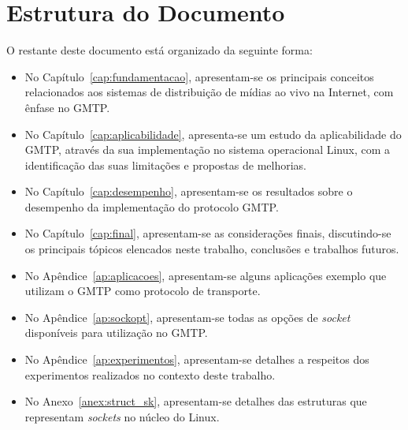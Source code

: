 % 
% 
% 
% 
\section{Estrutura do Documento}
\label{sec:estrutura}

O restante deste documento está organizado da seguinte forma:

\begin{itemize}
  \item No Capítulo~\ref{cap:fundamentacao}, apresentam-se os principais conceitos relacionados aos sistemas de distribuição de mídias ao vivo na Internet, com ênfase no GMTP.


  \item No Capítulo~\ref{cap:aplicabilidade}, apresenta-se um estudo da aplicabilidade do GMTP, através da sua implementação no sistema operacional Linux, com a identificação das suas limitações e propostas de melhorias.

  \item No Capítulo~\ref{cap:desempenho}, apresentam-se os resultados sobre o desempenho da implementação do protocolo GMTP.

  \item No Capítulo~\ref{cap:final}, apresentam-se as considerações finais, discutindo-se os principais tópicos elencados neste trabalho, conclusões e trabalhos futuros.

  \item No Apêndice~\ref{ap:aplicacoes}, apresentam-se alguns aplicações exemplo que utilizam o GMTP como protocolo de transporte.
  
  \item No Apêndice~\ref{ap:sockopt}, apresentam-se todas as opções de \textit{socket} disponíveis para utilização no GMTP.
  
  \item No Apêndice~\ref{ap:experimentos}, apresentam-se detalhes a respeitos dos experimentos realizados no contexto deste trabalho.
  
  \item No Anexo~\ref{anex:struct_sk}, apresentam-se detalhes das estruturas que representam \textit{sockets} no núcleo do Linux.

\end{itemize}
